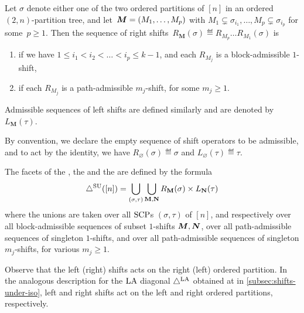 \begin{definition}
\label{def:SU-admissible}
Let $\sigma$ denote either one of the two ordered partitions of $[n]$ in an ordered \mbox{$(2,n)$-parti}\-tion tree, and let~$\boldsymbol{M} = (M_1,\dots,M_p)$ with $M_1 \subsetneq \sigma_{i_1}, \dots, M_p \subsetneq \sigma_{i_p}$ for some~$p \ge 1$.
Then the sequence of right shifts~$R_\mathbf{M}(\sigma) \eqdef R_{M_p} \dots R_{M_1}(\sigma)$ is 
\begin{enumerate}
\item {} if we have $1\leq i_1 < i_2 < \dots < i_p \leq k-1$, and each $R_{M_j}$ is a block-admissible $1$-shift,
\item {} if each $R_{M_j}$ is a path-admissible $m_j$-shift, for some $m_j \geq 1$.
\end{enumerate}
Admissible sequences of left shifts are defined similarly and are denoted by $L_\mathbf{M}(\tau)$.
\end{definition}

By convention, we declare the empty sequence of shift operators to be admissible, and to act by the identity, \ie we have $R_{\mathbf{\varnothing}}(\sigma)  \eqdef  \sigma$ and $L_{\mathbf{\varnothing}} (\tau) \eqdef  \tau$.

\begin{definition}
\label{def:classical-SU}
The facets of the , the  and the  are defined by the formula
\begin{align*}
\triangle^{\mathrm{SU}}([n]) = \bigcup_{(\sigma,\tau)} \bigcup_{\mathbf{M}, \mathbf{N}} R_\mathbf{M}(\sigma)\times L_\mathbf{N}(\tau)
\end{align*}
where the unions are taken over all $\mathrm{SCP}$s $(\sigma, \tau)$ of $[n]$, and respectively over all block-admissible sequences of subset $1$-shifts $\boldsymbol{M},\boldsymbol{N}$, over all path-admissible sequences of singleton $1$-shifts, and over all path-admissible sequences of singleton $m_j$-shifts, for various $m_j \ge 1$.
\end{definition}

\begin{remark}
Observe that the left (\resp right) shifts acts on the right (\resp left) ordered partition.
In the analogous description for the $\mathrm{LA}$ diagonal $\triangle^{\mathrm{LA}}$ obtained at in \cref{subsec:shifts-under-iso}, left and right shifts act on the left and right ordered partitions, respectively.
\end{remark}

